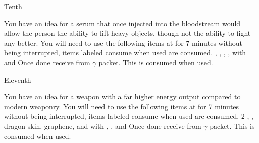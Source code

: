 \documentclass[greennotebook]{guildcamp3} %
\begin{document}
\begin{page}{Tenth}
	
	You have an idea for a serum that once injected into the bloodstream would allow the person the ability to lift heavy objects, though not the ability to fight any better.
	You will need to use the following items at \sSciWorkbench{} for 7 minutes without being interrupted, items labeled consume when used are consumed.
	\iCompoundNine{}, \iBloodPlasma{}, \iWerewolfFang{}, \iZirconia, \iGraphiteLube with \iMagnet{} and \iCentrifuge{}
	Once done receive \iSteroids{} from $\gamma$ packet. This is consumed when used. 
	
\end{page}

\begin{page}{Eleventh}
	
	You have an idea for a weapon with a far higher energy output compared to modern weaponry.
	You will need to use the following items at \sSciWorkbench{} for 7 minutes without being interrupted, items labeled consume when used are consumed.
	2 \iScrapMetal{}, \iNiobiumCarbide{}, dragon skin, graphene, and \iGraphiteLube with \iDiamondDrill{}, \iMultitool{}, and \iMonoBlade{}
	Once done receive \iUpgradedTechGun{} from $\gamma$ packet. This is consumed when used. 
	
\end{page}




\endnotebook
\end{document}
